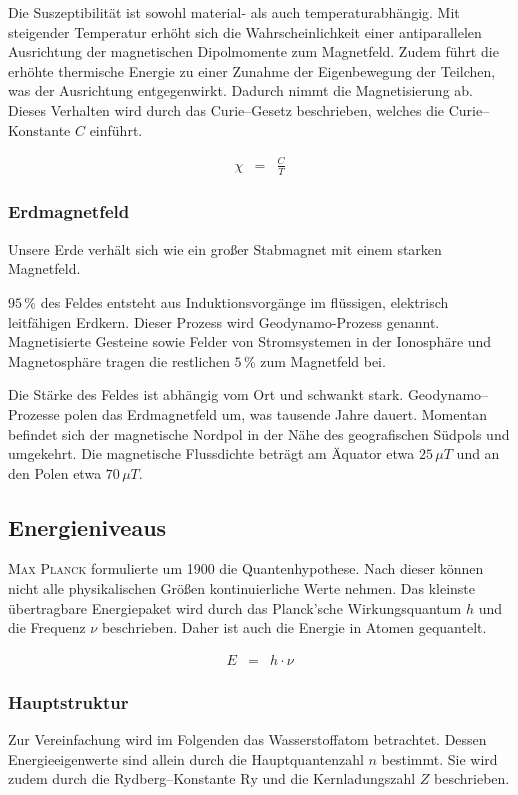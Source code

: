 \documentclass[12pt,a4paper]{scrartcl}
\numberwithin{equation}{section} %
\begin{document}
Die Suszeptibilität ist sowohl material- als auch temperaturabhängig. Mit steigender Temperatur erhöht sich die Wahrscheinlichkeit einer antiparallelen Ausrichtung der magnetischen Dipolmomente zum Magnetfeld. Zudem führt die erhöhte thermische Energie zu einer Zunahme der Eigenbewegung der Teilchen, was der Ausrichtung entgegenwirkt. Dadurch nimmt die Magnetisierung ab. Dieses Verhalten wird durch das Curie--Gesetz beschrieben, welches die Curie--Konstante $C$ einführt.

\begin{eqnarray}
	\chi &=& \frac{C}{T}
\end{eqnarray}

\subsubsection{Erdmagnetfeld}
\label{Erdmagnetfeld}
Unsere Erde verhält sich wie ein großer Stabmagnet mit einem starken Magnetfeld.

$95\,\%$ des Feldes entsteht aus Induktionsvorgänge im flüssigen, elektrisch leitfähigen Erdkern. Dieser Prozess wird Geodynamo-Prozess genannt. Magnetisierte Gesteine sowie Felder von Stromsystemen in der Ionosphäre und Magnetosphäre tragen die restlichen $5\,\%$ zum Magnetfeld bei.

Die Stärke des Feldes ist abhängig vom Ort und schwankt stark. Geodynamo--Prozesse polen das Erdmagnetfeld um, was tausende Jahre dauert. Momentan befindet sich der magnetische Nordpol in der Nähe des geografischen Südpols und umgekehrt. Die magnetische Flussdichte beträgt am Äquator etwa $25\,\mu T$ und an den Polen etwa $70\,\mu T$. \cite{Geomagnetismus}

\subsection{Energieniveaus}
\label{Energieniveaus}

\textsc{Max Planck} formulierte um 1900 die Quantenhypothese. Nach dieser können nicht alle physikalischen Größen kontinuierliche Werte nehmen. Das kleinste übertragbare Energiepaket wird durch das Planck'sche Wirkungsquantum $h$ und die Frequenz $\nu$ beschrieben. Daher ist auch die Energie in Atomen gequantelt.

\begin{eqnarray}
	E &=& h\cdot \nu \label{eq:Energie Strahlung}
\end{eqnarray}

\subsubsection{Hauptstruktur}
\label{Wasserstoffatom}
Zur Vereinfachung wird im Folgenden das Wasserstoffatom betrachtet. Dessen Energieeigenwerte sind allein durch die Hauptquantenzahl $n$ bestimmt. Sie wird zudem durch die Rydberg--Konstante $\mathrm{Ry}$ und die Kernladungszahl $Z$ beschrieben.
\end{document}
